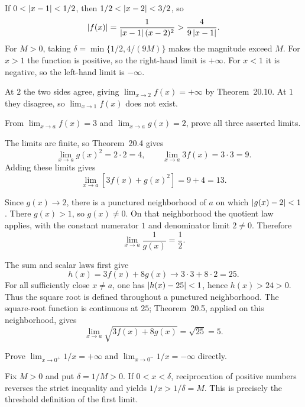 If $0<\left|x-1\right|<1/2$, then $1/2<\left|x-2\right|<3/2$, so
\[
 \left|f(x)\right|=\frac1{\left|x-1\right|(x-2)^2}
 >\frac4{9\left|x-1\right|}.
\]
For $M>0$, taking
$\delta=\min\{1/2,4/(9M)\}$ makes the magnitude exceed $M$.
For $x>1$ the function is positive, so the right-hand limit is
$+\infty$. For $x<1$ it is negative, so the left-hand limit is
$-\infty$.

At $2$ the two sides agree, giving
$\lim_{x\to2}f(x)=+\infty$ by Theorem~20.10.
At $1$ they disagree, so $\lim_{x\to1}f(x)$ does not exist.

\goal From $\lim_{x\to a}f(x)=3$ and
$\lim_{x\to a}g(x)=2$, prove all three asserted limits.

The limits are finite, so Theorem~20.4 gives
\[
 \lim_{x\to a}g(x)^2=2\cdot2=4,
 \qquad\lim_{x\to a}3f(x)=3\cdot3=9.
\]
Adding these limits gives
\[
 \lim_{x\to a}[3f(x)+g(x)^2]=9+4=13.
\]

Since $g(x)\to2$, there is a punctured neighborhood of $a$
on which $\left|g(x)-2\right|<1$. There $g(x)>1$, so $g(x)\ne0$.
On that neighborhood the quotient law applies, with the constant
numerator $1$ and denominator limit $2\ne0$. Therefore
\[
 \lim_{x\to a}\frac1{g(x)}=\frac12.
\]

The sum and scalar laws first give
\[
 h(x)=3f(x)+8g(x)\longrightarrow3\cdot3+8\cdot2=25.
\]
For all sufficiently close $x\ne a$, one has
$\left|h(x)-25\right|<1$, hence $h(x)>24>0$.
Thus the square root is defined throughout a punctured
neighborhood. The square-root function is continuous at $25$;
Theorem~20.5, applied on this neighborhood, gives
\[
 \lim_{x\to a}\sqrt{3f(x)+8g(x)}=\sqrt{25}=5.
\]

\goal Prove $\lim_{x\to0^+}1/x=+\infty$ and
$\lim_{x\to0^-}1/x=-\infty$ directly.

Fix $M>0$ and put $\delta=1/M>0$.
If $0<x<\delta$, reciprocation of positive numbers reverses
the strict inequality and yields $1/x>1/\delta=M$.
This is precisely the threshold definition of the first limit.

